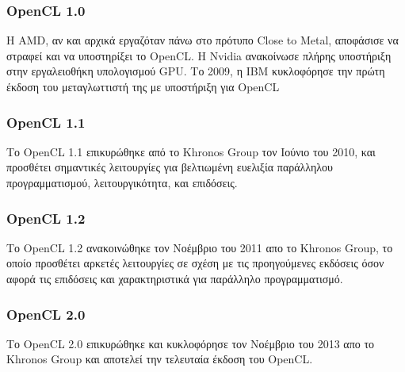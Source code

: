 \subsubsection{OpenCL 1.0} Η AMD, αν και αρχικά εργαζόταν πάνω στο πρότυπο Close to Metal, αποφάσισε να στραφεί και να υποστηρίξει το OpenCL. Η Nvidia ανακοίνωσε πλήρης υποστήριξη στην εργαλειοθήκη υπολογισμού GPU. Το 2009, η IBM κυκλοφόρησε την πρώτη έκδοση του μεταγλωττιστή της με υποστήριξη για OpenCL
\subsubsection{OpenCL 1.1} Το OpenCL 1.1 επικυρώθηκε από το Khronos Group τον Ιούνιο του 2010, και προσθέτει σημαντικές λειτουργίες για βελτιωμένη ευελιξία παράλληλου προγραμματισμού, λειτουργικότητα, και επιδόσεις.
\subsubsection{OpenCL 1.2} Το OpenCL 1.2 ανακοινώθηκε τον Νοέμβριο του 2011 απο το Khronos Group, το οποίο προσθέτει αρκετές λειτουργίες σε σχέση με τις προηγούμενες εκδόσεις όσον αφορά τις επιδόσεις και χαρακτηριστικά για παράλληλο προγραμματισμό.
\subsubsection{OpenCL 2.0} Το OpenCL 2.0 επικυρώθηκε και κυκλοφόρησε τον Νοέμβριο του 2013 απο το Khronos Group και αποτελεί την τελευταία έκδοση του OpenCL.